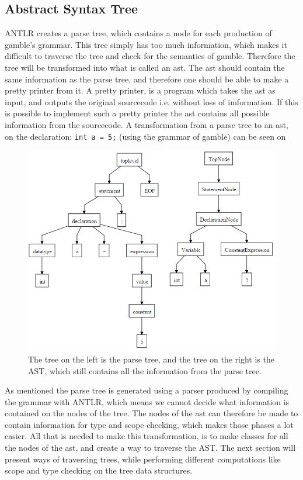 \subsection*{Abstract Syntax Tree}
ANTLR creates a parse tree, which contains a node for each production of \gls{gamble}'s grammar.
This tree simply has too much information, which makes it difficult to traverse the tree and check for the semantics of \gls{gamble}.
Therefore the tree will be transformed into what is called an \acrfull{ast}.
The \acrfull{ast} should contain the same information as the parse tree, and therefore one should be able to make a pretty printer from it.
A pretty printer, is a program which takes the \acrfull{ast} as input, and outputs the original sourcecode i.e. without loss of imformation.
If this is possible to implement such a pretty printer the \acrfull{ast} contains all possible information from the sourcecode.
A transformation from a parse tree to an \acrfull{ast}, on the declaration: \texttt{int a = 5;} (using the grammar of \gls{gamble}) can be seen on 

\begin{figure}
		\centering
	 	\includegraphics[width=0.8\linewidth]{figures/Trees/AST.PNG}
		\caption{The tree on the left is the parse tree, and the tree on the right is the AST, which still contains all the information from the parse tree.} \label{image:AST}
\end{figure}

As mentioned the parse tree is generated using a parser produced by compiling the grammar with ANTLR, which means we cannot decide what information is contained on the nodes of the tree.
The nodes of the \acrfull{ast} can therefore be made to contain information for type and scope checking, which makes those phases a lot easier.
All that is needed to make this transformation, is to make classes for all the nodes of the \acrfull{ast}, and create a way to traverse the AST.
The next section will present ways of traversing trees, while performing different computations like scope and type checking on the tree data structures.


